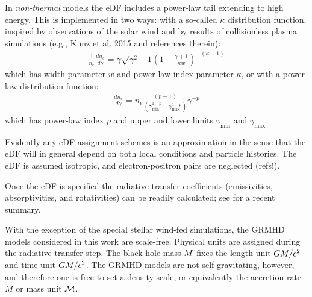 In {\it non-thermal} models the eDF includes a power-law tail extending to high energy.
This is implemented in two ways: with a so-called $\kappa$ distribution function, inspired by observations of the solar wind and by results of
collisionless plasma simulations (e.g., Kunz et al. 2015 and references therein):
\begin{align}
  \frac{1}{n_e} \frac{d n_e}{d\gamma}= \gamma \sqrt{\gamma^2-1} \left(1+\frac{\gamma+1}{\kappa w}\right)^{-(\kappa+1)}
\end{align}
which has width parameter $w$ and power-law index parameter $\kappa$, or with a power-law distribution function:
\begin{align}
  \frac{d n_e}{d\gamma} = n_e \frac{ (p-1)}{(\gamma_\mathrm{min}^{1-p} - \gamma_\mathrm{max}^{1-p})} \gamma^{-p}
  \label{eq:nonthermaleDF}
\end{align}
which has power-law index $p$ and upper and lower limits  $\gamma_{\min}$ and $\gamma_{\max}$.

Evidently any eDF assignment schemes is an approximation in the sense that the eDF will in general depend on both local conditions and particle histories.  The eDF is assumed isotropic, and electron-positron pairs are neglected (refs!).

Once the eDF is specified the radiative transfer coefficients (emissivities, absorptivities, and rotativities) can be readily calculated; see \cite{2021ApJ...921...17M} for a recent summary.



With the exception of the special stellar wind-fed simulations, the GRMHD models considered in this work are scale-free.  Physical units are assigned during the radiative transfer step.  The black hole mass $M$ fixes the length unit $GM/c^2$ and time unit $GM/c^3$.  The GRMHD models are not self-gravitating, however, and therefore one is free to set a density scale, or equivalently the accretion rate $\dot{M}$ or mass unit $\mathcal{M}$.

